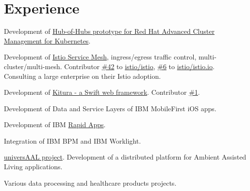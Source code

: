 \documentclass[]{deedy-resume}
\begin{document}
\hfill
\begin{minipage}[t]{0.66\textwidth}


\section{Experience}

\vspace{\topsep} %
\begin{tightemize}
\item Development of \href{https://github.com/stolostron/hub-of-hubs}{Hub-of-Hubs prototype for Red Hat Advanced Cluster Management for Kubernetes}.
\item Development of \href{https://istio.io}{Istio Service Mesh}, ingress/egress traffic control, multi-cluster/multi-mesh.
Contributor \href{https://github.com/istio/istio/graphs/contributors}{\#42} to \href{https://github.com/istio/istio}{istio/istio}, \href{https://github.com/istio/istio.io/graphs/contributors}{\#6} to \href{https://github.com/istio/istio.io}{istio/istio.io}. Consulting a large enterprise on their Istio adoption.
\item Development of \href{https://github.com/Kitura/Kitura}{Kitura - a Swift web framework}. Contributor \href{https://github.com/IBM-Swift/Kitura/graphs/contributors}{\#1}.
\item Development of Data and Service Layers of IBM MobileFirst iOS apps.
\item Development of IBM \href{https://heidloff.net/article/ibm-announces-citizen-developer-tool-to-build-situational-apps-bluemix-rapidapps/}{Rapid Apps}.
\item Integration of IBM BPM and IBM Worklight.
\end{tightemize}
\sectionsep

\vspace{\topsep} %
\begin{tightemize}
\item \href{https://cordis.europa.eu/project/id/247950}{universAAL project}. Development of a distributed platform for Ambient Assisted Living applications.
\item Various data processing and healthcare products projects.
\end{tightemize}
\sectionsep


\end{minipage}
\end{document}
